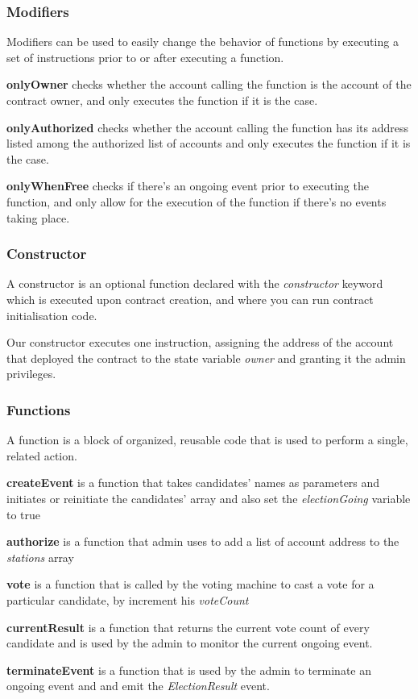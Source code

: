 \subsubsection{Modifiers}

Modifiers can be used to easily change the behavior of functions by executing a set of instructions prior to or after executing a function.

\begin{list}{}{}
\item \textbf{onlyOwner} checks whether the account calling the function is the account of the contract owner, and only executes the function if it is the case.
\item \textbf{onlyAuthorized} checks whether the account calling the function has its address listed among the authorized list of accounts and only executes the function if it is the case.
\item \textbf{onlyWhenFree} checks if there's an ongoing event prior to executing the function, and only allow for the execution of the function if there's no events taking place.
\end{list}

\subsubsection{Constructor}

A constructor is an optional function declared with the \textit{constructor} keyword which is executed upon contract creation, and where you can run contract initialisation code.

Our constructor executes one instruction, assigning the address of the account that deployed the contract to the state variable \textit{owner} and granting it the admin privileges.

\subsubsection{Functions}

A function is a block of organized, reusable code that is used to perform a single, related action.

\begin{list}{}{}
\item \textbf{createEvent} is a function that takes candidates' names as parameters and initiates or reinitiate the candidates' array and also set the \textit{electionGoing} variable to true
\item \textbf{authorize} is a function that admin uses to add a list of account address to the \textit{stations} array
\item \textbf{vote} is a function that is called by the voting machine to cast a vote for a particular candidate, by increment his \textit{voteCount}
\item \textbf{currentResult} is a function that returns the current vote count of every candidate and is used by the admin to monitor the current ongoing event.
\item \textbf{terminateEvent} is a function that is used by the admin to terminate an ongoing event and and emit the \textit{ElectionResult} event.
\end{list}